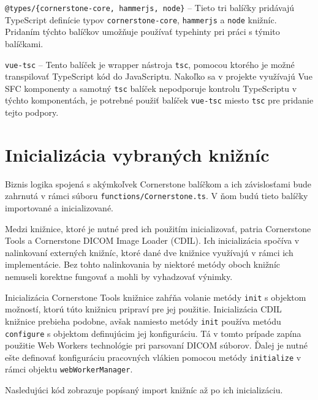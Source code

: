 \texttt{@types/\{cornerstone-core, hammerjs, node\}} -- Tieto tri balíčky pridávajú TypeScript definície typov \texttt{cornerstone-core}, \texttt{hammerjs} a \texttt{node} knižníc. Pridaním týchto balíčkov umožňuje používať typehinty pri práci s týmito balíčkami.

\texttt{vue-tsc} -- Tento balíček je wrapper nástroja \texttt{tsc}, pomocou ktorého je možné transpilovať TypeScript kód do JavaScriptu. Nakoľko sa v projekte využívajú Vue SFC komponenty a samotný \texttt{tsc} balíček nepodporuje kontrolu TypeScriptu v týchto komponentách, je potrebné použiť balíček \texttt{vue-tsc} miesto \texttt{tsc} pre pridanie tejto podpory. 

\section {Inicializácia vybraných knižníc}
Biznis logika spojená s akýmkoľvek Cornerstone balíčkom a ich závislosťami bude zahrnutá v rámci súboru \texttt{functions/Cornerstone.ts}. V ňom budú tieto balíčky importované a inicializované.

Medzi knižnice, ktoré je nutné pred ich použitím inicializovať, patria Cornerstone Tools a Cornerstone DICOM Image Loader (CDIL). Ich inicializácia spočíva v nalinkovaní externých knižníc, ktoré dané dve knižnice využívajú v rámci ich implementácie. Bez tohto nalinkovania by niektoré metódy oboch knižníc nemuseli korektne fungovať a mohli by vyhadzovať výnimky.

Inicializácia Cornerstone Tools knižnice zahŕňa volanie metódy \texttt{init} s objektom možností, ktorú túto knižnicu pripraví pre jej použitie. Inicializácia CDIL knižnice prebieha podobne, avšak namiesto metódy \texttt{init} používa metódu \texttt{configure} s objektom definujúcim jej konfiguráciu. Tá v tomto prípade zapína použitie Web Workers technológie pri parsovaní DICOM súborov. Ďalej je nutné ešte definovať konfiguráciu pracovných vlákien pomocou metódy \texttt{initialize} v rámci objektu \texttt{webWorkerManager}.

Nasledujúci kód zobrazuje popísaný import knižníc až po ich inicializáciu.

